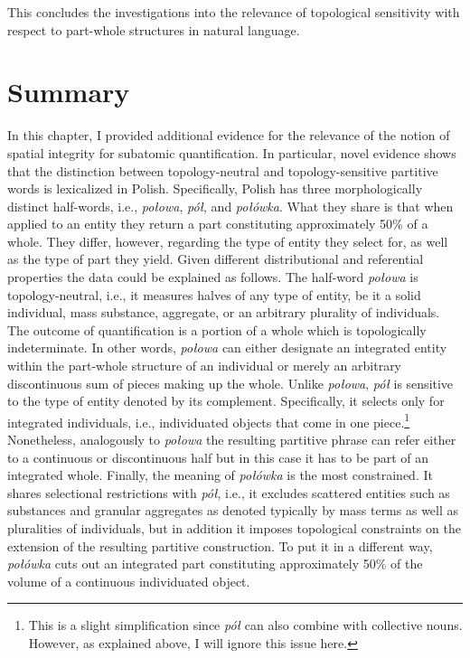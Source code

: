 This concludes the investigations into the relevance of topological sensitivity with respect to part-whole structures in natural language.

\section{Summary}\label{sec:summary-ch3}\largerpage

In this chapter, I provided additional evidence for the relevance of the notion of spatial integrity for subatomic quantification. In particular, novel evidence shows that the distinction between topology-neutral and topology-sensitive partitive words is lexicalized in Polish. Specifically, Polish has three morphologically distinct half-words, i.e., \textit{połowa}, \textit{pół}, and \textit{połówka}. What they share is that when applied to an entity they return a part constituting approximately 50\% of a whole. They differ, however, regarding the type of entity they select for, as well as the type of part they yield. Given different distributional and referential properties the data could be explained as follows. The half-word \textit{połowa} is topology-neutral, i.e., it measures halves of any type of entity, be it a solid individual, mass substance, aggregate, or an arbitrary plurality of individuals. The outcome of quantification is a portion of a whole which is topologically indeterminate. In other words, \textit{połowa} can either designate an integrated entity within the part-whole structure of an individual or merely an arbitrary discontinuous sum of pieces making up the whole. Unlike \textit{połowa}, \textit{pół} is sensitive to the type of entity denoted by its complement. Specifically, it selects only for integrated individuals, i.e., individuated objects that come in one piece.\footnote{This is a slight simplification since \textit{pół} can also combine with collective nouns. However, as explained above, I will ignore this issue here.} Nonetheless, analogously to \textit{połowa} the resulting partitive phrase can refer either to a continuous or discontinuous half but in this case it has to be part of an integrated whole. Finally, the meaning of \textit{połówka} is the most constrained. It shares selectional restrictions with \textit{pół}, i.e., it excludes scattered entities such as substances and granular aggregates as denoted typically by mass terms as well as pluralities of individuals, but in addition it imposes topological constraints on the extension of the resulting partitive construction. To put it in a different way, \textit{połówka} cuts out an integrated part constituting approximately 50\% of the volume of a continuous individuated object.

